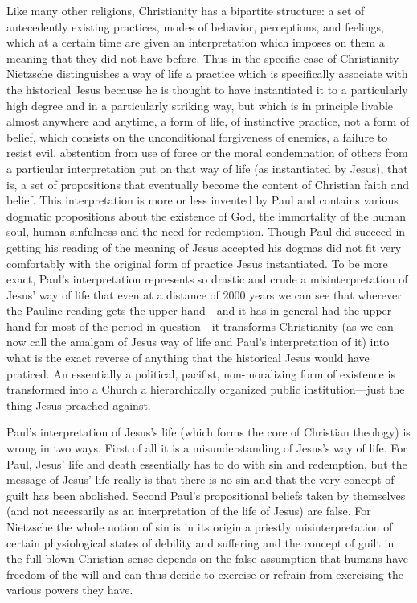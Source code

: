Like many other religions, Christianity has a bipartite structure: a set of antecedently existing practices, modes of behavior, perceptions, and feelings, which at a certain time are given an interpretation which imposes on them a meaning that they did not have before. Thus in the specific case of Christianity Nietzsche distinguishes a way of life a practice which is specifically associate with the historical Jesus because he is thought to have instantiated it to a particularly high degree and in a particularly striking way, but which is in principle livable almost anywhere and anytime, a form of life, of instinctive practice, not a form of belief, which consists on the unconditional forgiveness of enemies, a failure to resist evil, abstention from use of force or the moral condemnation of others from a particular interpretation put on that way of life (as instantiated by Jesus), that is, a set of propositions that eventually become the content of Christian faith and belief. This interpretation is more or less invented by Paul and contains various dogmatic propositions about the existence of God, the immortality of the human soul, human sinfulness and the need for redemption. Though Paul did succeed in getting his reading of the meaning of Jesus accepted his dogmas did not fit very comfortably with the original form of practice Jesus instantiated. To be more exact, Paul's interpretation represents so drastic and crude a misinterpretation of Jesus' way of life that even at a distance of 2000 years we can see that wherever the Pauline reading gets the upper hand---and it has in general had the upper hand for most of the period in question---it transforms Christianity (as we can now call the amalgam of Jesus way of life and Paul's interpretation of it) into what is the exact reverse of anything that the historical Jesus would have praticed. An essentially a political, pacifist, non-moralizing form of existence is transformed into a Church a hierarchically organized public institution---just the thing Jesus preached against.

Paul's interpretation of Jesus's life (which forms the core of Christian theology) is wrong in two ways. First of all it is a misunderstanding of Jesus's way of life. For Paul, Jesus' life and death essentially has to do with sin and redemption, but the message of Jesus' life really is that there is no sin and that the very concept of guilt has been abolished. Second Paul's propositional beliefs taken by themselves (and not necessarily as an interpretation of the life of Jesus) are false. For Nietzsche the whole notion of sin is in its origin a priestly misinterpretation of certain physiological states of debility and suffering and the concept of guilt in the full blown Christian sense depends on the false assumption that humans have freedom of the will and can thus decide to exercise or refrain from exercising the various powers they have.

